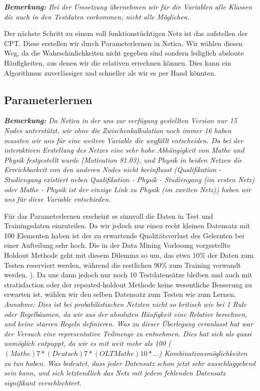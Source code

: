 \textit{\textbf{Bemerkung:} Bei der Umsetzung übernehmen wir für die Variablen alle Klassen die auch in den Testdaten vorkommen, nicht alle Möglichen.}

Der nächste Schritt zu einem voll funktionstüchtigen Netz ist das aufstellen der CPT. Diese erstellen wir durch Parameterlernen in Netica. Wir wählen diesen Weg, da die Wahrschinlichkeiten nicht gegeben sind sondern lediglich absloute Häufigkeiten, aus denen wir die relativen errechnen können. Dies kann ein Algorithmus zuverlässiger und schneller als wir es per Hand könnten. 

\subsection{Parameterlernen}
\textit{\textbf{Bemerkung: } Da Netica in der uns zur verfügung gestellten Version nur 15 Nodes unterstützt, wir ohne die Zwischenkalkulation noch immer 16 haben mussten wir uns für eine weitere Variable die wegfällt entscheiden. Da bei der interaktiven Erstellung des Netzes eine sehr hohe Abhängigkeit von Mathe und Physik festgestellt wurde (Motivation 81.03), und Physik in beiden Netzen die Erreichbarkeit von den anderen Nodes nicht beeinflusst (Qualifikation - Studiengang existiert neben Qualifikation - Physik - Studiengang (im ersten Netz) oder Mathe - Physik ist der einzige Link zu Physik (im zweiten Netz)) haben wir uns für diese Variable entschieden.}

Für das Parameterlernen erscheint es sinnvoll die Daten in Test und Trainingsdaten einzuteilen. Da wir jedoch nur einen recht kleinen Datensatz mit 100 Elementen haben ist der zu erwartende Qualitätsverlust des Gelernten bei einer Aufteilung sehr hoch. Die in der Data Mining Vorlesung  vorgestellte Holdout Methode geht mit diesem Dilemma so um, das etwa 10\% der Daten zum Testen reserviert werden, während die restlichen 90\% zum Training verwandt werden. \parencite{schmeier}). 
Da uns dann jedoch nur noch 10 Testdatensätze bleiben und auch mit stratisfaction oder der repeated-holdout Methode keine wesentliche Besserung zu erwarten ist, wählen wir den selben Datensatz zum Testen wie zum Lernen. \textit{Annahme: Dies ist bei probabilistischen Netzten nicht so kritisch wie bei 1 Rule oder Regelbäumen, da wir aus der absoluten Häufigkeit eine Relative berechnen, und keine starren Regeln definieren. Was zu dieser Überlegung veranlasst hat war der Versuch eine representative Teilmenge zu entnehmen. Dies hat sich als quasi unmöglich entpuppt, da wir es mit weit mehr als 100  ($(Mathe) 7 * (Deutsch) 7 * (OLT Mathe) 10 * ...$)  Kombinationsmöglichkeiten zu tun haben. Was bedeutet, dass jeder Datensatz schon jetzt sehr ausschlaggebend sein kann, und sich letztendlich das Netz mit jedem fehlenden Datensatz signifikant verschlechtert.} 

